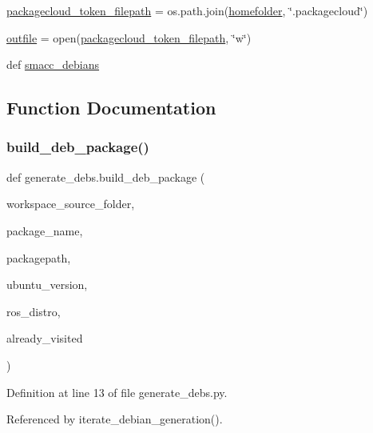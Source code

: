 \begin{DoxyCompactItemize}
\item 
\hyperlink{namespacegenerate__debs_a836a20b989c3c8e46255d91d10cb524f}{packagecloud\+\_\+token\+\_\+filepath} = os.\+path.\+join(\hyperlink{namespacegenerate__debs_aeb83979be2939a8059435a906a91f682}{homefolder}, \char`\"{}.packagecloud\char`\"{})
\item 
\hyperlink{namespacegenerate__debs_aa1faa039b35b72ee44dc6f106ad12911}{outfile} = open(\hyperlink{namespacegenerate__debs_a836a20b989c3c8e46255d91d10cb524f}{packagecloud\+\_\+token\+\_\+filepath}, \char`\"{}w\char`\"{})
\item 
def \hyperlink{namespacegenerate__debs_acca5eaf9f83b81a32c26c7a7c5f9bdd7}{smacc\+\_\+debians}
\end{DoxyCompactItemize}


\subsection{Function Documentation}
\mbox{\label{namespacegenerate__debs_aa70c3f4917ddc57b13eaed8501f571a8}} 
\subsubsection{\texorpdfstring{build\+\_\+deb\+\_\+package()}{build\_deb\_package()}}
{\footnotesize\ttfamily def generate\+\_\+debs.\+build\+\_\+deb\+\_\+package (\begin{DoxyParamCaption}\item[{}]{workspace\+\_\+source\+\_\+folder,  }\item[{}]{package\+\_\+name,  }\item[{}]{packagepath,  }\item[{}]{ubuntu\+\_\+version,  }\item[{}]{ros\+\_\+distro,  }\item[{}]{already\+\_\+visited }\end{DoxyParamCaption})}



Definition at line 13 of file generate\+\_\+debs.\+py.



Referenced by iterate\+\_\+debian\+\_\+generation().


